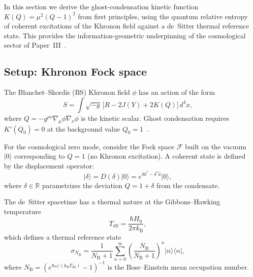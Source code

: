 \documentclass[letterpaper,twocolumn,superscriptaddress,longbibliography]{revtex4-2}
\newcommand{\kB}{k_{\mathrm{B}}}
\newcommand{\ket}[1]{|#1\rangle}
\newcommand{\bra}[1]{\langle#1|}
\newcommand{\TdS}{T_{\mathrm{dS}}}
\newcommand{\NB}{N_{\mathrm{B}}}
\begin{document}
In this section we derive the ghost-condensation kinetic function
$K(Q) = \mu^2(Q-1)^2$ from first principles, using the quantum
relative entropy of coherent excitations of the Khronon field
against a de~Sitter thermal reference state.
This provides the information-geometric underpinning of the
cosmological sector of Paper~III~\cite{PaperIII}.

\subsection{Setup: Khronon Fock space}

The Blanchet--Skordis (BS) Khronon field $\phi$ has an action of
the form~\cite{BS2024}
\begin{equation}
  S = \int \sqrt{-g}\,\bigl[R - 2J(Y) + 2K(Q)\bigr]\,d^4x,
  \label{eq:BS_action}
\end{equation}
where $Q = -g^{\mu\nu}\nabla_\mu\phi\nabla_\nu\phi$ is the
kinetic scalar.  Ghost condensation requires
$K'(Q_0) = 0$ at the background value
$Q_0 = 1$~\cite{ArkaniHamed2004}.

For the cosmological zero mode, consider the Fock space
$\mathcal{F}$ built on the vacuum $\ket{0}$ corresponding to
$Q = 1$ (no Khronon excitation).
A coherent state is defined by the displacement operator:
\begin{equation}
  \ket{\delta} = D(\delta)\ket{0}
  = e^{\delta \hat{a}^\dagger - \delta^* \hat{a}}\ket{0},
  \label{eq:coherent_state}
\end{equation}
where $\delta \in \mathbb{R}$ parametrizes the deviation
$Q = 1 + \delta$ from the condensate.

The de~Sitter spacetime has a thermal nature at the Gibbons--Hawking
temperature~\cite{GH1977}
\begin{equation}
  \TdS = \frac{\hbar H_0}{2\pi \kB},
  \label{eq:TdS}
\end{equation}
which defines a thermal reference state
\begin{equation}
  \sigma_{\NB}
  = \frac{1}{\NB + 1}
    \sum_{n=0}^{\infty}
    \left(\frac{\NB}{\NB + 1}\right)^{\!n} \ket{n}\!\bra{n},
  \label{eq:thermal_state}
\end{equation}
where $\NB = (e^{\hbar\omega/(\kB \TdS)} - 1)^{-1}$ is the
Bose--Einstein mean occupation number.

\end{document}
